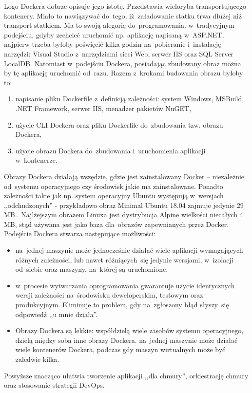 \documentclass[12pt,a4paper,twoside,titlepage,openright]{book}
\begin{document}
Logo Dockera dobrze opisuje jego istotę. Przedstawia wieloryba transportującego kontenery. Miało to nawiązywać do~tego, iż~załadowanie statku trwa dłużej niż transport statkiem. Ma to swoją alegorię do~programowania. w~tradycyjnym podejściu, gdyby zechcieć uruchomić np. aplikację napisaną w~ASP.NET, najpierw trzeba byłoby poświęcić kilka godzin na~pobieranie i~instalację narzędzi: Visual Studio z~narzędziami sieci Web, serwer IIS oraz SQL Server LocalDB. Natomiast w~podejściu Dockera, posiadając zbudowany obraz można by tę aplikację uruchomić od~razu. Razem z~krokami budowania obrazu byłoby to:
\begin{enumerate}
\item napisanie pliku Dockerfile z~definicją zależności: system Windows, MSBuild, .NET Framework, serwer IIS, menadżer pakietów NuGET,
\item użycie CLI Dockera oraz pliku Dockerfile do~zbudowania tzw. obrazu Dockera,
\item użycie obrazu Dockera do~zbudowania i~uruchomienia aplikacji w~kontenerze.
\end{enumerate}
Obrazy Dockera działają wszędzie, gdzie jest zainstalowany Docker -- niezależnie od~systemu operacyjnego czy środowisk jakie ma zainstalowane. Ponadto zależności takie jak np. system operacyjny Ubuntu występują w~wersjach ,,odchudzonych'' - przykładowo obraz Minimal Ubuntu 18.04 zajmuje jedynie 29 MB.\cite{siteUbuntuBlog}. Najlżejszym obrazem Linuxa jest dystrybucja Alpine wielkości niecałych 4 MB, stąd używana jest jako baza dla~obrazów zapewnianych przez Docker.\cite{dockerPacktMastering}
Podejście Dockera stwarza następujące możliwości:
\begin{itemize}
\item na~jednej maszynie może jednocześnie działać wiele aplikacji wymagających różnych zależności, lub nawet różniących~się jedynie wersjami, w~izolacji od~siebie oraz maszyny, na~której są uruchomione.
\item w~procesie wytwarzania oprogramowania gwarantuje użycie identycznych wersji zależności na~środowisku deweloperskim, testowym oraz produkcyjnym. Eliminuje to problem, gdy na~zgłoszony błąd słyszy~się odpowiedź ,,u mnie działa''.
\item Obrazy Dockera są lekkie: współdzielą wiele zasobów systemu operacyjnego, dzielą między sobą inne obrazy Dockera.\cite{siteDockerStackOverflow} na~jednej maszynie może działać wiele kontenerów Dockera, podczas gdy maszyn wirtualnych może być zaledwie kilka.\cite{ccSpringer}
\end{itemize}
Powyższe znacząco ułatwia tworzenie aplikacji ,,dla chmury'', orkiestrację chmury oraz stosowanie strategii DevOps.
\end{document}
